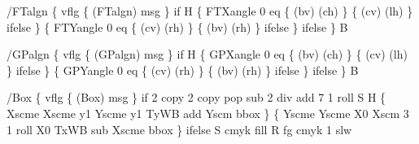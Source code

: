 \documentclass[11pt]{article}
\def\nwendcode{\endtrivlist \endgroup} %
\let\nwdocspar=\par                    %
\begin{document}
\nwenddocs{}\endmoddef
/FTalgn \{  %
  vflg \{ (FTalgn) msg \} if  %
  H \{  %
    FTXangle 0 eq \{  %
      (bv) (ch)  %
    \} \{  %
      (cv) (lh)  %
    \} ifelse  %
  \} \{  %
    FTYangle 0 eq \{  %
      (cv) (rh)  %
    \} \{  %
      (bv) (rh)  %
    \} ifelse  %
  \} ifelse  %
\} B  %
\eatline
{}\nwendcode{}\nwdocspar
\nwenddocs{}\endmoddef
/GPalgn \{  %
  vflg \{ (GPalgn) msg \} if  %
  H \{  %
    GPXangle 0 eq \{  %
      (bv) (ch)  %
    \} \{  %
      (cv) (lh)  %
    \} ifelse  %
  \} \{  %
    GPYangle 0 eq \{  %
      (cv) (rh)  %
    \} \{  %
      (bv) (rh)  %
    \} ifelse  %
  \} ifelse  %
\} B  %
\eatline
{}\nwendcode{}\nwdocspar
\nwenddocs{}\endmoddef
/Box \{  %
  vflg \{ (Box) msg \} if  %
  2 copy  %
  2 copy  %
  pop  %
  sub  %
  2 div  %
  add  %
  7 1 roll  %
  S  %
    H \{  %
      Xscme  %
      Xscme  %
      y1 Yscme  %
      y1  %
      TyWB add  %
      Yscm  %
      bbox  %
    \} \{  %
      Yscme  %
      Yscme  %
      X0 Xscm  %
      3 1 roll  %
      X0  %
      TxWB sub  %
      Xscme  %
      bbox  %
    \} ifelse  %
    S  %
      cmyk  %
      fill  %
    R  %
    fg cmyk  %
    1 slw  %
\end{document}
